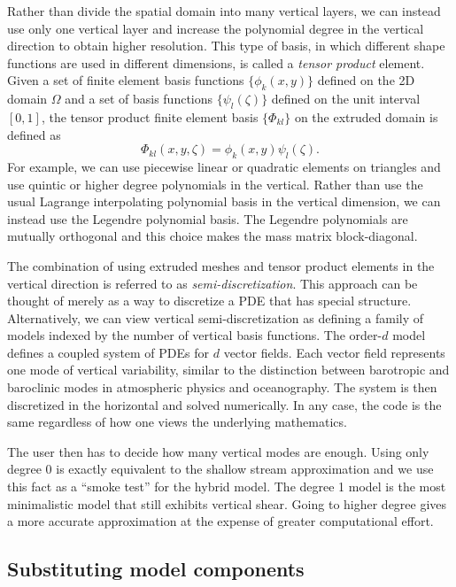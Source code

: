 \documentclass{article}
\theoremstyle{definition}
\theoremstyle{plain}
\begin{document}
Rather than divide the spatial domain into many vertical layers, we can instead use only one vertical layer and increase the polynomial degree in the vertical direction to obtain higher resolution.
This type of basis, in which different shape functions are used in different dimensions, is called a \emph{tensor product} element.
Given a set of finite element basis functions $\{\phi_k(x, y)\}$ defined on the 2D domain $\Omega$ and a set of basis functions $\{\psi_l(\zeta)\}$ defined on the unit interval $[0, 1]$, the tensor product finite element basis $\{\Phi_{kl}\}$ on the extruded domain is defined as
\begin{equation}
    \Phi_{kl}(x, y, \zeta) = \phi_k(x, y)\psi_l(\zeta).
\end{equation}
For example, we can use piecewise linear or quadratic elements on triangles and use quintic or higher degree polynomials in the vertical.
Rather than use the usual Lagrange interpolating polynomial basis in the vertical dimension, we can instead use the Legendre polynomial basis.
The Legendre polynomials are mutually orthogonal and this choice makes the mass matrix block-diagonal.

The combination of using extruded meshes and tensor product elements in the vertical direction is referred to as \emph{semi-discretization}.
This approach can be thought of merely as a way to discretize a PDE that has special structure.
Alternatively, we can view vertical semi-discretization as defining a family of models indexed by the number of vertical basis functions.
The order-$d$ model defines a coupled system of PDEs for $d$ vector fields.
Each vector field represents one mode of vertical variability, similar to the distinction between barotropic and baroclinic modes in atmospheric physics and oceanography.
The system is then discretized in the horizontal and solved numerically.
In any case, the code is the same regardless of how one views the underlying mathematics.

The user then has to decide how many vertical modes are enough.
Using only degree 0 is exactly equivalent to the shallow stream approximation and we use this fact as a ``smoke test'' for the hybrid model.
The degree 1 model is the most minimalistic model that still exhibits vertical shear.
Going to higher degree gives a more accurate approximation at the expense of greater computational effort.

\subsection{Substituting model components} \label{sec:physics-substitution}
\end{document}
